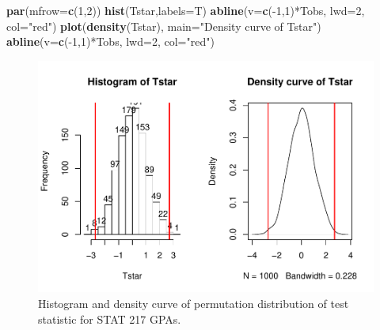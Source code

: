 \documentclass[]{book}
\newenvironment{Shaded}{\begin{snugshade}}{\end{snugshade}}
\newcommand{\KeywordTok}[1]{\textcolor[rgb]{0.13,0.29,0.53}{\textbf{{#1}}}}
\newcommand{\DataTypeTok}[1]{\textcolor[rgb]{0.13,0.29,0.53}{{#1}}}
\newcommand{\DecValTok}[1]{\textcolor[rgb]{0.00,0.00,0.81}{{#1}}}
\newcommand{\StringTok}[1]{\textcolor[rgb]{0.31,0.60,0.02}{{#1}}}
\newcommand{\OtherTok}[1]{\textcolor[rgb]{0.56,0.35,0.01}{{#1}}}
\newcommand{\NormalTok}[1]{{#1}}
\begin{document}
\begin{Shaded}
\end{Shaded}




\begin{Shaded}
\begin{Highlighting}[]
\KeywordTok{par}\NormalTok{(}\DataTypeTok{mfrow=}\KeywordTok{c}\NormalTok{(}\DecValTok{1}\NormalTok{,}\DecValTok{2}\NormalTok{))}
\KeywordTok{hist}\NormalTok{(Tstar,}\DataTypeTok{labels=}\NormalTok{T)}
\KeywordTok{abline}\NormalTok{(}\DataTypeTok{v=}\KeywordTok{c}\NormalTok{(-}\DecValTok{1}\NormalTok{,}\DecValTok{1}\NormalTok{)*Tobs, }\DataTypeTok{lwd=}\DecValTok{2}\NormalTok{, }\DataTypeTok{col=}\StringTok{"red"}\NormalTok{)}
\KeywordTok{plot}\NormalTok{(}\KeywordTok{density}\NormalTok{(Tstar), }\DataTypeTok{main=}\StringTok{"Density curve of Tstar"}\NormalTok{)}
\KeywordTok{abline}\NormalTok{(}\DataTypeTok{v=}\KeywordTok{c}\NormalTok{(-}\DecValTok{1}\NormalTok{,}\DecValTok{1}\NormalTok{)*Tobs, }\DataTypeTok{lwd=}\DecValTok{2}\NormalTok{, }\DataTypeTok{col=}\StringTok{"red"}\NormalTok{)}
\end{Highlighting}
\end{Shaded}

\begin{figure}[htbp]
\centering
\includegraphics{GreenwoodBanner_files/figure-latex/Figure2-16-1.pdf}
\caption{\label{fig:Figure2-16}Histogram and density curve of permutation distribution of
test statistic for STAT 217 GPAs.}
\end{figure}
\end{document}
